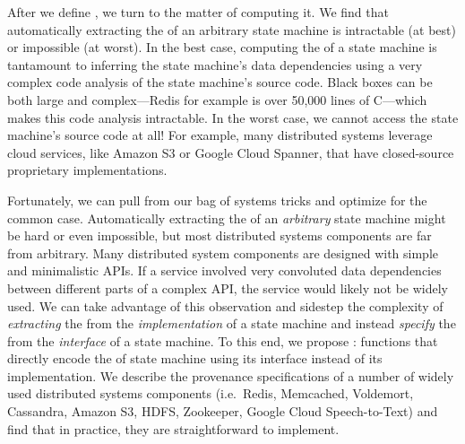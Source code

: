 After we define \watprovenance{}, we turn to the matter of computing it. We find
that automatically extracting the \watprovenance{} of an arbitrary state
machine is intractable (at best) or impossible (at worst). In the best case,
computing the \watprovenance{} of a state machine is tantamount to inferring
the state machine's data dependencies using a very complex code analysis of the
state machine's source code. Black boxes 
can be both large and complex---Redis
for example is over 50,000 lines of C---which makes this code analysis
intractable. In the worst case, we cannot access the state machine's source
code at all! For example, many distributed systems leverage cloud services,
like Amazon S3 or Google Cloud Spanner, that have closed-source proprietary
implementations.

Fortunately, we can pull from our bag of systems tricks and optimize for the
common case. Automatically extracting the \watprovenance{} of an
\emph{arbitrary} state machine might be hard or even impossible, but most
distributed systems components are far from arbitrary. Many distributed system
components are designed with simple and minimalistic APIs. If a service
involved very convoluted data dependencies between different parts of a complex
API, the service would likely not be widely used. We can take advantage of this
observation and sidestep the complexity of \emph{extracting} the
\watprovenance{} from the \emph{implementation} of a state machine and instead
\emph{specify} the \watprovenance{} from the \emph{interface} of a state
machine. To this end, we propose :
functions that directly encode the \watprovenance{} of state machine using its
interface instead of its implementation.  We describe the provenance
specifications of a number of widely used distributed systems components
(i.e.\ Redis, Memcached, Voldemort, Cassandra, Amazon S3, HDFS, Zookeeper,
Google Cloud Speech-to-Text) and find that in practice, they are
straightforward to implement.

